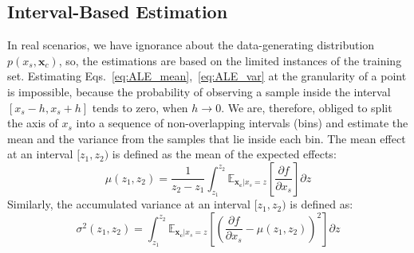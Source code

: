 \documentclass[twoside]{article}
\newcommand{\xc}{\mathbf{x_c}}
\begin{document}
\subsection{Interval-Based Estimation}
\label{sec:interval-based-estimation}

In real scenarios, we have ignorance about the data-generating
distribution \(p(x_s, \mathbf{x}_c)\), so, the estimations are based
on the limited instances of the training set. Estimating
Eqs.~\eqref{eq:ALE_mean},~\eqref{eq:ALE_var} at the granularity of a
point is impossible, because the probability of observing a sample
inside the interval \([x_s - h, x_s + h]\) tends to zero, when
\(h \to 0\). We are, therefore, obliged to split the axis of \(x_s\)
into a sequence of non-overlapping intervals (bins) and estimate the
mean and the variance from the samples that lie inside each bin. The
mean effect at an interval \([z_1, z_2)\) is defined as the mean of
the expected effects:
\begin{equation}
  \label{eq:mu_bin}
  \mu(z_1, z_2) = \frac{1}{z_2 - z_1} \int_{z_1}^{z_2}
  \mathbb{E}_{\xc|x_s=z}\left [\frac{\partial f}{\partial x_s} \right ] \partial z
\end{equation}
\noindent
Similarly, the accumulated variance at an interval \([z_1, z_2)\) is
defined as:
\begin{equation}
  \label{eq:var_bin}
  \sigma^2(z_1, z_2) = \int_{z_1}^{z_2}
  \mathbb{E}_{\xc|x_s=z} \left [ (\frac{\partial
      f}{\partial x_s} - \mu(z_1, z_2) )^2 \right] \partial z
\end{equation}
\end{document}
